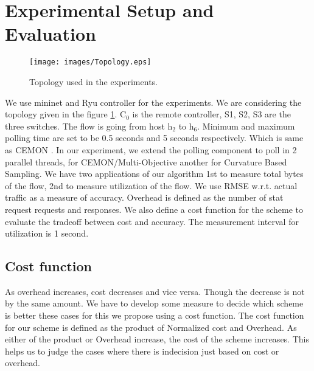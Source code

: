 \section{Experimental Setup and Evaluation}

\begin{figure}[ht]
\texttt{[image: images/Topology.eps]}
\caption{Topology used in the experiments.}
\label{fig:topo}
\end{figure}

We use mininet and Ryu controller for the experiments.
We are considering the topology given in the figure \ref{fig:topo}. C$_0$ is the remote controller, S1, S2, S3 are the three switches.
The flow is going from host h$_{2}$ to h$_{6}$.
Minimum and maximum polling time are set to be 0.5 seconds and 5 seconds respectively.
Which is same as CEMON \cite{CEMON}. 
In our experiment, we extend the polling component to poll in 2 parallel threads, for CEMON/Multi-Objective another for Curvature Based Sampling.
We have two applications of our algorithm 1st to measure total bytes of the flow, 2nd to measure utilization of the flow.
We use RMSE w.r.t. actual traffic as a measure of accuracy.
Overhead is defined as the number of stat request requests and responses.
We also define a cost function for the scheme to evaluate the tradeoff between cost and accuracy.
The measurement interval for utilization is 1 second.

\subsection{Cost function}
As overhead increases, cost decreases and vice versa. Though the decrease is not by the same amount.
We have to develop some measure to decide which scheme is better these cases for this we propose using a cost function.
The cost function for our scheme is defined as the product of Normalized cost and Overhead.
As either of the product or Overhead increase, the cost of the scheme increases.
This helps us to judge the cases where there is indecision just based on cost or overhead. 



